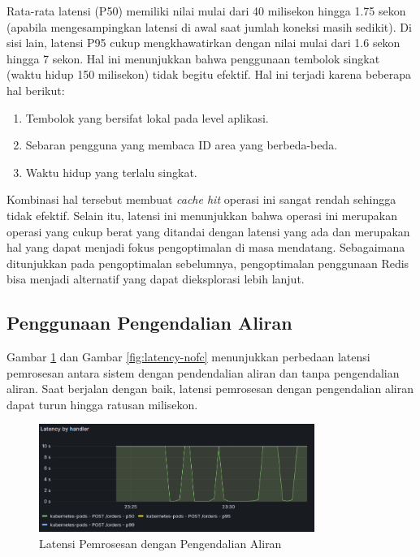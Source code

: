 Rata-rata latensi (P50) memiliki nilai mulai dari 40 milisekon hingga 1.75 sekon (apabila mengesampingkan latensi di awal saat jumlah koneksi masih sedikit). Di sisi lain, latensi P95 cukup mengkhawatirkan dengan nilai mulai dari 1.6 sekon hingga 7 sekon. Hal ini menunjukkan bahwa penggunaan tembolok singkat (waktu hidup 150 milisekon) tidak begitu efektif. Hal ini terjadi karena beberapa hal berikut:

\begin{enumerate}
    \item Tembolok yang bersifat lokal pada level aplikasi.
    \item Sebaran pengguna yang membaca ID area yang berbeda-beda.
    \item Waktu hidup yang terlalu singkat.
\end{enumerate}

Kombinasi hal tersebut membuat \textit{cache hit} operasi ini sangat rendah sehingga tidak efektif. Selain itu, latensi ini menunjukkan bahwa operasi ini merupakan operasi yang cukup berat yang ditandai dengan latensi yang ada dan merupakan hal yang dapat menjadi fokus pengoptimalan di masa mendatang. Sebagaimana ditunjukkan pada pengoptimalan sebelumnya, pengoptimalan penggunaan Redis bisa menjadi alternatif yang dapat dieksplorasi lebih lanjut.

\subsection{Penggunaan Pengendalian Aliran}

Gambar \ref{fig:latency-fc} dan Gambar \ref{fig:latency-nofc} menunjukkan perbedaan latensi pemrosesan antara sistem dengan pendendalian aliran dan tanpa pengendalian aliran. Saat berjalan dengan baik, latensi pemrosesan dengan pengendalian aliran dapat turun hingga ratusan milisekon.

\begin{figure}[htbp]
    \centering
    \includegraphics[width=0.8\textwidth]{resources/chapter-4/latency-fc-pg-stress-0.png}
    \caption{Latensi Pemrosesan dengan Pengendalian Aliran}
    \label{fig:latency-fc}
\end{figure}

